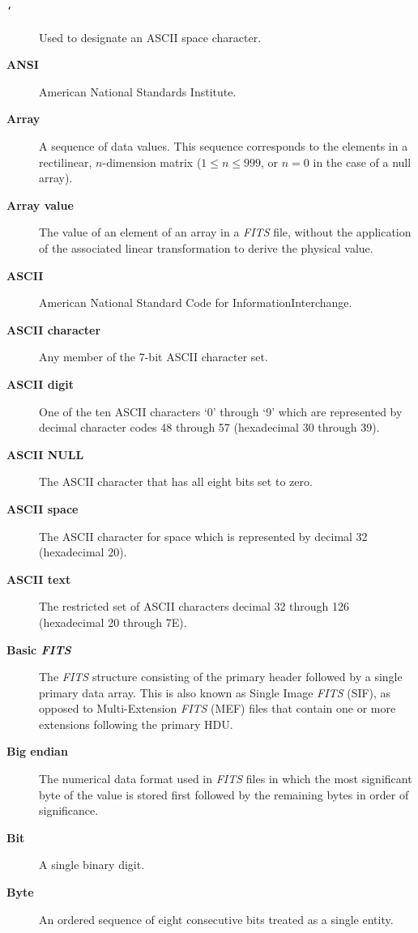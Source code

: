 \documentclass[onecolumn]{aa}
\begin{document}
\begin{description}
\item[\hbox{\tt\char`\ }] Used to designate an ASCII space character.
\item[\bf ANSI] American National Standards
    Institute.
\item[\bf Array]  A sequence of data values. This sequence 
     corresponds to the elements in a rectilinear, $n$-dimension matrix 
     ($1 \leq n \leq 999$, or $n = 0$ in the case of a null array).
\item[\bf Array value] The value of an element of an array 
     in a {\em FITS\/} file, without the application of the 
     associated linear transformation to derive the
     physical value.
\item[\bf ASCII] American National Standard Code 
             for Information\linebreak[1] Interchange.
\item[\bf ASCII character] Any 
      member of the 7-bit ASCII character set. 
\item[\bf ASCII digit] One of the ten ASCII characters `0' through `9'
      which are represented by decimal character codes 48 through 57
      (hexadecimal 30 through 39).
\item[\bf ASCII NULL] The ASCII character that has all eight 
      bits set to zero.
\item[\bf ASCII space] The ASCII character for space
      which is represented by decimal 32 (hexadecimal 20).
\item[\bf ASCII text] The restricted set of ASCII characters 
      decimal 32 through 126 (hexadecimal 20 through 7E).
\item[\bf Basic {\em\bf FITS}] The {\em FITS\/} 
      structure consisting of
      the primary header followed by a single
      primary data array. This is also known
      as  Single Image {\em FITS\/} (SIF), as opposed to 
      Multi-Extension {\em FITS\/} (MEF) files that contain 
      one or more extensions following the primary HDU.
\item[\bf Big endian]  The numerical data format used in {\em FITS\/} files 
in which the most significant byte of the value is stored first followed by the
remaining bytes in order of significance.
\item[\bf Bit] A single binary digit.
\item[\bf Byte] An ordered sequence of eight consecutive bits treated as a single entity.

\end{description}
\end{document}
